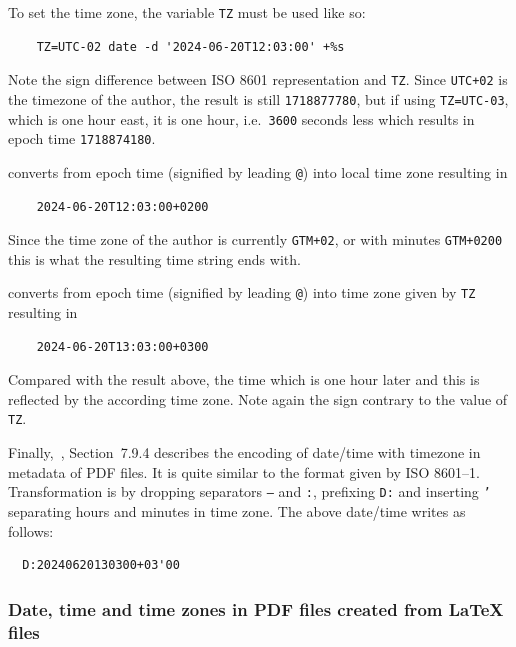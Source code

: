\documentclass[a4paper]{article}%
\begin{document}
\begin{description}
  To set the time zone, the variable \texttt{TZ} must be used like so: 
  \begin{verbatim}
    TZ=UTC-02 date -d '2024-06-20T12:03:00' +%s
  \end{verbatim}
  Note the sign difference between ISO 8601 representation and \texttt{TZ}. 
  Since \texttt{UTC+02} is the timezone of the author, the result is still \texttt{1718877780}, 
  but if using \texttt{TZ=UTC-03}, which is one hour east, 
  it is one hour, i.e.~\@ \texttt{3600} seconds less which results in epoch time \texttt{1718874180}. 
  \item[\texttt{date -d '@1718877780' +\%FT\%T\%z}] 
  converts from epoch time (signified by leading \texttt{@}) into local time zone resulting in 
  \begin{verbatim}
    2024-06-20T12:03:00+0200
  \end{verbatim}
  Since the time zone of the author is currently \texttt{GTM+02}, or with minutes \texttt{GTM+0200}
  this is what the resulting time string ends with. 
  \item[\texttt{TZ=UTC-03 date -d '@1718877780' +\%FT\%T\%z}] 
  converts from epoch time (signified by leading \texttt{@}) into time zone given by \texttt{TZ} resulting in 
  \begin{verbatim}
    2024-06-20T13:03:00+0300
  \end{verbatim}
  Compared with the result above, the time which is one hour later 
  and this is reflected by the according time zone. 
  Note again the sign contrary to the value of \texttt{TZ}. 
\end{description}


Finally,~\cite{Pdf20}, Section~7.9.4 describes the encoding 
of date/time with timezone in metadata of PDF files. 
It is quite similar to the format given by ISO 8601--1. 
Transformation is by dropping separators \texttt{--} and \texttt{:}, 
prefixing \texttt{D:} and inserting \texttt{'} separating hours and minutes in time zone. 
The above date/time writes as follows: 
%
\begin{verbatim}
  D:20240620130300+03'00
\end{verbatim}

\subsubsection{Date, time and time zones in PDF files created from \LaTeX{} files}%
\label{subsubsec:dateTimeZoneTexPdf}
\end{document}
